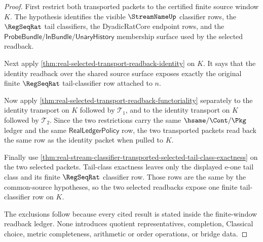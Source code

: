 \begin{proof}
First restrict both transported packets to the certified finite source window
$K$. The hypothesis identifies the visible $\StreamNameUp$ classifier rows,
the $\RegSeqRat$ tail classifiers, the DyadicRatCore endpoint rows, and the
$\mathsf{ProbeBundle}/\mathsf{InBundle}/\mathsf{UnaryHistory}$ membership
surface used by the selected readback.

Next apply
\autoref{thm:real-selected-transport-readback-identity} on $K$. It says that
the identity readback over the shared source surface exposes exactly the
original finite $\RegSeqRat$ tail-classifier row attached to $n$.

Now apply
\autoref{thm:real-selected-transport-readback-functoriality} separately to
the identity transport on $K$ followed by $\mathcal{T}_1$, and to the identity
transport on $K$ followed by $\mathcal{T}_2$. Since the two restrictions carry
the same $\hsame/\Cont/\Pkg$ ledger and the same
$\mathsf{RealLedgerPolicy}$ row, the two transported packets read back the
same row as the identity packet when pulled to $K$.

Finally use
\autoref{thm:real-stream-classifier-transported-selected-tail-class-exactness}
on the two selected packets. Tail-class exactness leaves only the displayed
e-one tail class and its finite $\RegSeqRat$ classifier row. Those rows are
the same by the common-source hypotheses, so the two selected readbacks expose
one finite tail-classifier row on $K$.

The exclusions follow because every cited result is stated inside the
finite-window readback ledger. None introduces quotient representatives,
completion, Classical choice, metric completeness, arithmetic or order
operations, or bridge data.
\end{proof}

